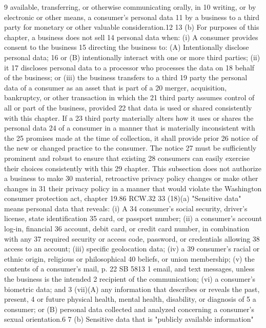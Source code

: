 9 available, transferring, or otherwise communicating orally, in
10 writing, or by electronic or other means, a consumer's personal data
11 by a business to a third party for monetary or other valuable
consideration.12
13 (b) For purposes of this chapter, a business does not sell
14 personal data when: (i) A consumer provides consent to the business
15 directing the business to: (A) Intentionally disclose personal data;
16 or (B) intentionally interact with one or more third parties; (ii) it
17 discloses personal data to a processor who processes the data on
18 behalf of the business; or (iii) the business transfers to a third
19 party the personal data of a consumer as an asset that is part of a
20 merger, acquisition, bankruptcy, or other transaction in which the
21 third party assumes control of all or part of the business, provided
22 that data is used or shared consistently with this chapter. If a
23 third party materially alters how it uses or shares the personal data
24 of a consumer in a manner that is materially inconsistent with the
25 promises made at the time of collection, it shall provide prior
26 notice of the new or changed practice to the consumer. The notice
27 must be sufficiently prominent and robust to ensure that existing
28 consumers can easily exercise their choices consistently with this
29 chapter. This subsection does not authorize a business to make
30 material, retroactive privacy policy changes or make other changes in
31 their privacy policy in a manner that would violate the Washington
consumer protection act, chapter 19.86 RCW.32
33 (18)(a) "Sensitive data" means personal data that reveals: (i) A
34 consumer's social security, driver's license, state identification
35 card, or passport number; (ii) a consumer's account log-in, financial
36 account, debit card, or credit card number, in combination with any
37 required security or access code, password, or credentials allowing
38 access to an account; (iii) specific geolocation data; (iv) a
39 consumer's racial or ethnic origin, religious or philosophical
40 beliefs, or union membership; (v) the contents of a consumer's mail,
p. 22 SB 5813
1 email, and text messages, unless the business is the intended
2 recipient of the communication; (vi) a consumer's biometric data; and
3 (vii)(A) any information that describes or reveals the past, present,
4 or future physical health, mental health, disability, or diagnosis of
5 a consumer; or (B) personal data collected and analyzed concerning a
consumer's sexual orientation.6
7 (b) Sensitive data that is "publicly available information"
